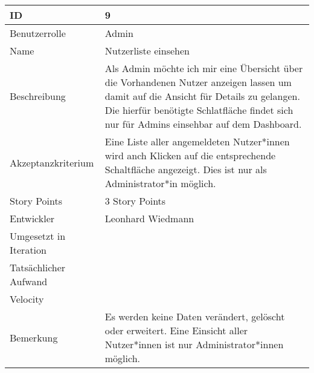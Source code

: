 \begin{tabularx}{\textwidth}{|p{}|X|}
	\hline
	ID & 9\\
	\hline
	Benutzerrolle & Admin\\
	\hline
	Name & Nutzerliste einsehen\\
	\hline
	Beschreibung & Als Admin möchte ich mir eine Übersicht über die Vorhandenen Nutzer anzeigen lassen um damit auf die Ansicht für Details zu gelangen. Die hierfür benötigte Schlatfläche findet sich nur für Admins einsehbar auf dem Dashboard.\\
	\hline
	Akzeptanzkriterium & Eine Liste aller angemeldeten Nutzer*innen wird anch Klicken auf die entsprechende Schaltfläche angezeigt. Dies ist nur als Administrator*in möglich.\\
	\hline
	Story Points & 3 Story Points\\
	\hline
	Entwickler & Leonhard Wiedmann\\
	\hline
	Umgesetzt in Iteration & \\
	\hline
	Tatsächlicher Aufwand & \\
	\hline
	Velocity & \\
	\hline
	Bemerkung & Es werden keine Daten verändert, gelöscht oder erweitert. Eine Einsicht aller Nutzer*innen ist nur Administrator*innen möglich.\\
	\hline
\end{tabularx}
\vspace{20pt}

